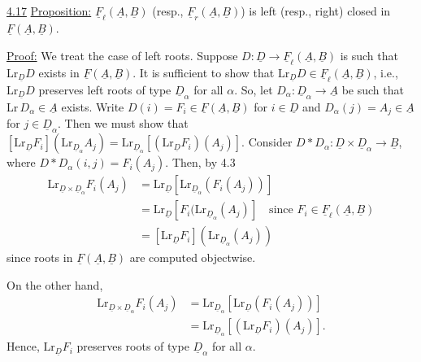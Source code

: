 
\uline{4.17} \uline{Proposition:} $\underline{F}_\ell(\underline{A},\underline{B})$ (resp., $\underline{F}_r(\underline{A},\underline{B})$) is left (resp.,
right) closed in $\underline{F}(\underline{A},\underline{B})$.

\uline{Proof:} We treat the case of left roots. Suppose
$D:\underline{D}\longrightarrow\underline{F}_\ell(\underline{A},\underline{B})$ is such that $\mathrm{Lr}_{\underline{D}}D$ exists in $\underline{F}(\underline{A},\underline{B})$. It
is sufficient to show that $\mathrm{Lr}_{\underline{D}}D\in\underline{F}_\ell(\underline{A},\underline{B})$, i.e., $\mathrm{Lr}_{\underline{D}}D$
preserves left roots of type $\underline{D}_\alpha$ for all $\alpha$. So, let
$D_\alpha:\underline{D}_\alpha\longrightarrow\underline{A}$ be such that $\mathrm{Lr}\,D_\alpha\in\underline{A}$ exists. Write
$D(i)=F_i\in\underline{F}(\underline{A},\underline{B})$ for $i\in\underline{D}$ and $D_\alpha(j)=A_j\in\underline{A}$ for $j\in\underline{D}_\alpha$.
Then we must show that $[\mathrm{Lr}_{\underline{D}}F_i](\mathrm{Lr}_{\underline{D}_\alpha}A_j)=\mathrm{Lr}_{\underline{D}_\alpha}[(\mathrm{Lr}_{\underline{D}}F_i)(A_j)]$.
Consider $D*D_\alpha:\underline{D}\times\underline{D}_\alpha\longrightarrow\underline{B}$, where $D*D_\alpha(i,j)=F_i(A_j)$.
Then, by 4.3
\[
\begin{aligned}
\mathrm{Lr}_{\underline{D}\times\underline{D}_\alpha}F_i(A_j)
&=\mathrm{Lr}_{\underline{D}}[\mathrm{Lr}_{\underline{D}_\alpha}(F_i(A_j))]\\
&=\mathrm{Lr}_{\underline{D}}[F_i(\mathrm{Lr}_{\underline{D}_\alpha}(A_j)]
\quad\text{since }F_i\in\underline{F}_\ell(\underline{A},\underline{B})\\
&=[\mathrm{Lr}_{\underline{D}}F_i](\mathrm{Lr}_{\underline{D}_\alpha}(A_j))
\end{aligned}
\]
since roots in $\underline{F}(\underline{A},\underline{B})$ are computed objectwise.

On the other hand,
\[
\begin{aligned}
\mathrm{Lr}_{\underline{D}\times\underline{D}_\alpha}F_i(A_j)
&=\mathrm{Lr}_{\underline{D}_\alpha}[\mathrm{Lr}_{\underline{D}}(F_i(A_j))]\\
&=\mathrm{Lr}_{\underline{D}_\alpha}[(\mathrm{Lr}_{\underline{D}}F_i)(A_j)].
\end{aligned}
\]
Hence, $\mathrm{Lr}_{\underline{D}}F_i$ preserves roots of type $\underline{D}_\alpha$ for all $\alpha$.
